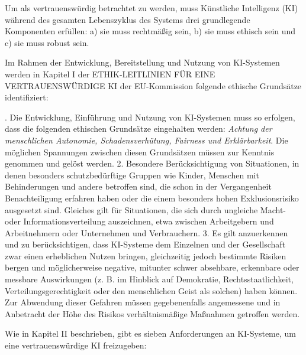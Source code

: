 \documentclass[12pt]{article}
\begin{document}
Um als vertrauenswürdig betrachtet zu werden, muss Künstliche Intelligenz (KI) während des gesamten Lebenszyklus des Systems drei grundlegende Komponenten erfüllen: a) sie muss rechtmäßig sein, b) sie muss ethisch sein und c) sie muss robust sein.

Im Rahmen der Entwicklung, Bereitstellung und Nutzung von KI-Systemen werden in Kapitel I der \glqq ETHIK-LEITLINIEN FÜR EINE VERTRAUENSWÜRDIGE KI\grqq{} der EU-Kommission folgende ethische Grundsätze identifiziert:

. Die Entwicklung, Einführung und Nutzung von KI-Systemen muss so erfolgen, dass die folgenden ethischen Grundsätze eingehalten werden: \textit{Achtung der menschlichen Autonomie, Schadensverhütung, Fairness und Erklärbarkeit}. Die möglichen Spannungen zwischen diesen Grundsätzen müssen zur Kenntnis genommen und gelöst werden. 
2. Besondere Berücksichtigung von Situationen, in denen besonders schutzbedürftige Gruppen wie Kinder, Menschen mit Behinderungen und andere betroffen sind, die schon in der Vergangenheit Benachteiligung erfahren haben oder die einem besonders hohen Exklusionsrisiko ausgesetzt sind. Gleiches gilt für Situationen, die sich durch ungleiche Macht- oder Informationsverteilung auszeichnen, etwa zwischen Arbeitgebern und Arbeitnehmern oder Unternehmen und Verbrauchern.
3. Es gilt anzuerkennen und zu berücksichtigen, dass KI-Systeme dem Einzelnen und der Gesellschaft zwar einen erheblichen Nutzen bringen, gleichzeitig jedoch bestimmte Risiken bergen und möglicherweise negative, mitunter schwer absehbare, erkennbare oder messbare Auswirkungen (z. B. im Hinblick auf Demokratie, Rechtsstaatlichkeit, Verteilungsgerechtigkeit oder den menschlichen Geist als solchen) haben können. Zur Abwendung dieser Gefahren müssen gegebenenfalls angemessene und in Anbetracht der Höhe des Risikos verhältnismäßige Maßnahmen getroffen werden.\grqq{}

Wie in Kapitel II beschrieben, gibt es sieben Anforderungen an KI-Systeme, um eine vertrauenswürdige KI freizugeben:
\end{document}
